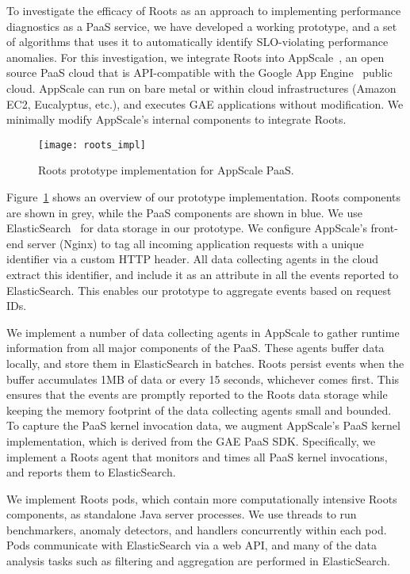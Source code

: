 To investigate the efficacy of Roots as an approach to
implementing performance diagnostics as a PaaS service, we have developed a
working prototype, and a set of algorithms that uses it to automatically
identify SLO-violating performance anomalies.
For this investigation, we integrate Roots into AppScale~\cite{6488671}, an open source PaaS cloud
that is API-compatible with the Google App Engine~\cite{gae} public cloud.  
AppScale can run on bare metal or within cloud infrastructures (Amazon EC2, Eucalyptus, 
etc.), and executes GAE applications without modification.
We minimally modify AppScale's internal components to integrate Roots.

\begin{figure}
\centering
\texttt{[image: roots\_impl]}
\caption{Roots prototype implementation for AppScale PaaS.}
\label{fig:roots_impl}
\end{figure}

Figure~\ref{fig:roots_impl} shows an overview of our prototype implementation. Roots components
are shown in grey, while the PaaS components are shown in blue.
We use ElasticSearch~\cite{Kononenko:2014:MMR:2597073.2597091} for data storage in our prototype. 
We configure AppScale's front-end server (Nginx) to tag all incoming application requests
with a unique identifier via a custom HTTP header. 
All data collecting agents in the cloud extract this identifier, and include it as an attribute
in all the events reported to ElasticSearch. This enables our prototype to aggregate events based 
on request IDs.

We implement a number of data collecting agents in AppScale to gather runtime information
from all major components of the PaaS. These agents buffer data locally, and store them in ElasticSearch
in batches. Roots persist events when the buffer accumulates 1MB of data or every 15 seconds, whichever comes
first.  This ensures that the events are promptly reported to the Roots data
storage while keeping the memory footprint of the data collecting agents small and bounded. 
To capture the PaaS kernel invocation data, we augment AppScale's PaaS kernel implementation,
which is derived from the GAE PaaS SDK. Specifically, we implement a Roots agent that monitors
and times all PaaS kernel invocations, and reports them to ElasticSearch. 

We implement Roots pods, which contain more computationally intensive Roots components, 
as standalone Java server processes. We use threads to run benchmarkers,
anomaly detectors, and handlers concurrently within each pod. Pods communicate with ElasticSearch via
a web API, and many of the data analysis tasks such as filtering and aggregation are performed
in ElasticSearch.

